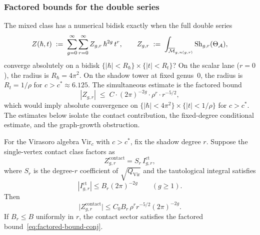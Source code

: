 \subsubsection{Factored bounds for the double series}

The mixed class has a numerical bidisk exactly when the full double
series
\begin{equation}\label{eq:double-series-def}
Z(\hbar,t) \;:=\; \sum_{g=0}^\infty \sum_{r=0}^\infty
Z_{g,r}\,\hbar^{2g}\,t^r,
\qquad
Z_{g,r} \;:=\; \int_{\overline{\mathcal{M}}_{g,n(g,r)}}
\operatorname{Sh}_{g,r}(\Theta_{\mathcal{A}}),
\end{equation}
converge absolutely on a bidisk
$\{|\hbar| < R_\hbar\} \times \{|t| < R_t\}$? On the scalar lane
($r = 0$), the radius is $R_\hbar = 4\pi^2$. On the shadow tower at
fixed genus~$0$, the radius is $R_t = 1/\rho$ for
$c > c^* \approx 6.125$. The simultaneous estimate is the
factored bound
\begin{equation}\label{eq:factored-bound-conj}
|Z_{g,r}| \;\leq\; C \cdot (2\pi)^{-2g} \cdot \rho^r \cdot r^{-5/2},
\end{equation}
which would imply absolute convergence on
$\{|\hbar| < 4\pi^2\} \times \{|t| < 1/\rho\}$ for $c > c^*$.
The estimates below isolate the contact contribution, the fixed-degree
conditional estimate, and the graph-growth obstruction.

\begin{proposition}
\label{prop:contact-contribution-bound}
For the Virasoro algebra $\mathrm{Vir}_c$ with $c>c^*$, fix the
shadow degree $r$. Suppose the single-vertex contact class factors as
\[
Z_{g,r}^{\mathrm{contact}}
=
S_r\,I_{g,r}^{\mathrm{ct}},
\]
where $S_r$ is the degree-$r$ coefficient of
$\sqrt{Q_{\mathrm{Vir}}}$ and the tautological integral satisfies
\begin{equation}\label{eq:contact-tautological-decay}
|I_{g,r}^{\mathrm{ct}}|
\leq
B_r(2\pi)^{-2g}
\qquad(g\geq 1).
\end{equation}
Then
\begin{equation}\label{eq:contact-bound}
\bigl|Z_{g,r}^{\mathrm{contact}}\bigr|
\leq
C_0B_r\,\rho^r r^{-5/2}(2\pi)^{-2g}.
\end{equation}
If $B_r\leq B$ uniformly in $r$, the contact sector satisfies the
factored bound~\eqref{eq:factored-bound-conj}.
\end{proposition}

